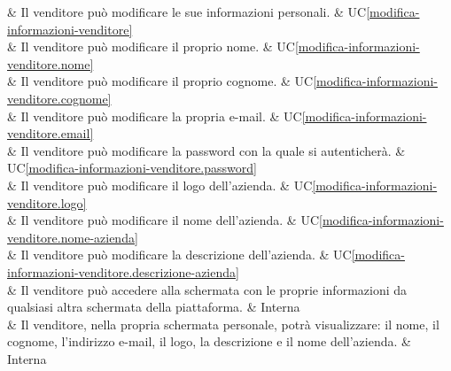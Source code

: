  & Il venditore può modificare le sue informazioni personali. & UC\ref{modifica-informazioni-venditore} \\
	
 & Il venditore può modificare il proprio nome. & UC\ref{modifica-informazioni-venditore.nome} \\
	
 & Il venditore può modificare il proprio cognome. & UC\ref{modifica-informazioni-venditore.cognome} \\
	
 & Il venditore può modificare la propria e-mail. & UC\ref{modifica-informazioni-venditore.email} \\

 & Il venditore può modificare la password con la quale si autenticherà. & UC\ref{modifica-informazioni-venditore.password} \\
	
 & Il venditore può modificare il logo dell'azienda. & UC\ref{modifica-informazioni-venditore.logo} \\
	
 & Il venditore può modificare il nome dell'azienda. & UC\ref{modifica-informazioni-venditore.nome-azienda} \\
	
 & Il venditore può modificare la descrizione dell'azienda. & UC\ref{modifica-informazioni-venditore.descrizione-azienda} \\

 & Il venditore può accedere alla schermata con le proprie informazioni da qualsiasi altra schermata della piattaforma. & Interna \\
	
 & Il venditore, nella propria schermata personale, potrà visualizzare: il nome, il cognome, l'indirizzo e-mail, il logo, la descrizione e il nome dell'azienda. & Interna \\ 